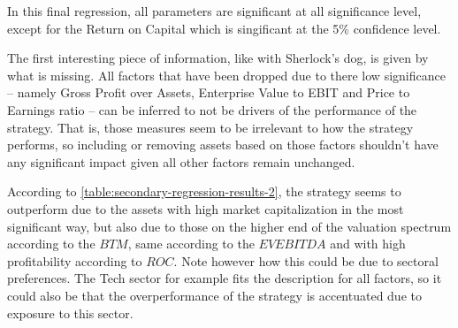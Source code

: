 In this final regression, all parameters are significant at all significance level, except for the Return on Capital which is singificant at the 5\% confidence level. 

The first interesting piece of information, like with Sherlock's dog, is given by what is missing. All factors that have been dropped due to there low significance -- namely Gross Profit over Assets, Enterprise Value to EBIT and Price to Earnings ratio -- can be inferred to not be drivers of the performance of the strategy. That is, those measures seem to be irrelevant to how the strategy performs, so including or removing assets based on those factors shouldn't have any significant impact given all other factors remain unchanged. 

According to \autoref{table:secondary-regression-results-2}, the strategy seems to outperform due to the assets with high market capitalization in the most significant way, but also due to those on the higher end of the valuation spectrum according to the $BTM$, same according to the $EVEBITDA$ and  with high profitability according to $ROC$. Note however how this could be due to sectoral preferences. The Tech sector for example fits the description for all factors, so it could also be that the overperformance of the strategy is accentuated due to exposure to this sector. 